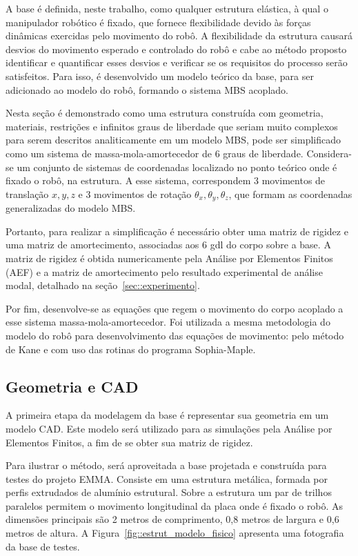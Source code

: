 A base é definida, neste trabalho, como qualquer estrutura elástica, à qual o
manipulador robótico é fixado, que fornece flexibilidade devido às forças
dinâmicas exercidas pelo movimento do robô. A flexibilidade da estrutura causará
desvios do movimento esperado e controlado do robô e cabe ao método proposto
identificar e quantificar esses desvios e verificar se os requisitos do processo
serão satisfeitos. Para isso, é desenvolvido um modelo teórico da base, para ser
adicionado ao modelo do robô, formando o sistema MBS acoplado.

Nesta seção é demonstrado como uma estrutura construída com geometria,
materiais, restrições e infinitos graus de liberdade que seriam muito complexos
para serem descritos analiticamente em um modelo MBS, pode ser simplificado como
um sistema de massa-mola-amortecedor de 6 graus de liberdade.
Considera-se um conjunto de sistemas de coordenadas localizado no ponto teórico
onde é fixado o robô, na estrutura. A esse sistema, correspondem 3 movimentos de
translação $x,y,z$ e 3 movimentos de rotação $\theta_x, \theta_y, \theta_z$, que
formam as coordenadas generalizadas do modelo MBS.

Portanto, para realizar a simplificação é necessário obter uma matriz de rigidez
e uma matriz de amortecimento, associadas aos 6 gdl do corpo sobre a base. A
matriz de rigidez é obtida numericamente pela Análise por Elementos Finitos
(AEF) e a matriz de amortecimento pelo resultado experimental de análise modal,
detalhado na seção~\ref{sec::experimento}.

Por fim, desenvolve-se as equações que regem o movimento do corpo acoplado a
esse sistema massa-mola-amortecedor.
Foi utilizada a mesma metodologia do modelo do robô para desenvolvimento das
equações de movimento: pelo método de Kane e com uso das rotinas do programa
Sophia-Maple.

\subsection{Geometria e CAD}

A primeira etapa da modelagem da base é representar sua geometria em um modelo
CAD. Este modelo será utilizado para as simulações pela Análise por Elementos
Finitos, a fim de se obter sua matriz de rigidez.

Para ilustrar o método, será aproveitada a base projetada e construída para
testes do projeto EMMA. Consiste em uma estrutura metálica, formada por perfis
extrudados de alumínio estrutural. Sobre a estrutura um par de trilhos paralelos
permitem o movimento longitudinal da placa onde é fixado o robô. As dimensões
principais são 2 metros de comprimento, 0,8 metros de largura e 0,6 metros de
altura. A Figura~\ref{fig::estrut_modelo_fisico} apresenta uma fotografia da
base de testes.

